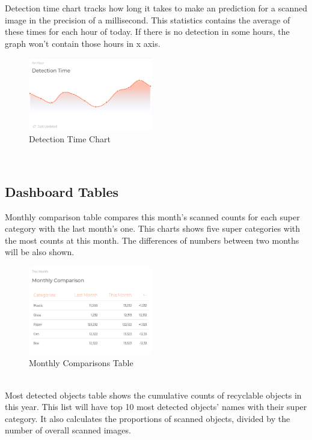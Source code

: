 \documentclass[conference]{IEEEtran}
\begin{document}
\newpage
Detection time chart tracks how long it takes to make an prediction for a scanned image in the precision of a millisecond. This statistics contains the average of these times for each hour of today. If there is no detection in some hours, the graph won't contain those hours in x axis.~\\

\begin{figure}[h]
    \centering
    \includegraphics[width=0.48\textwidth]{images/chart_detection_time.eps}
    \caption{Detection Time Chart}
\end{figure}~\\

\newpage
\subsection{Dashboard Tables}
Monthly comparison table compares this month's scanned counts for each super category with the last month's one. This charts shows five super categories with the most counts at this month. The differences of numbers between two months will be also shown.~\\

\begin{figure}[h]
    \centering
    \includegraphics[width=0.48\textwidth]{images/chart_monthly_comp.eps}
    \caption{Monthly Comparisons Table}
\end{figure}~\\

Most detected objects table shows the cumulative counts of recyclable objects in this year. This list will have top 10 most detected objects' names with their super category. It also calculates the proportions of scanned objects, divided by the number of overall scanned images.~\\
\end{document}
